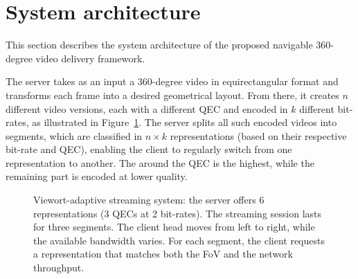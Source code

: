 \section{System architecture}

%    

This section describes the system architecture of the proposed
navigable 360-degree video delivery framework.

The server takes as an input a 360-degree video in
equirectangular format and transforms each frame into a desired
geometrical layout. From there, it creates $n$ different video
versions, each with a different \ac{QEC} and encoded in $k$ different
bit-rates, as illustrated in Figure~\ref{fig:newdelivery}. The server
splits all such encoded videos into segments, which are classified in
$n\!\times\!k$ representations (based on their respective bit-rate and
\ac{QEC}), enabling the client to regularly switch from one
representation to another. The  around the
\ac{QEC} is the highest, while the remaining part is encoded at lower
quality.

\begin{figure}
   \centering
   
   \caption{Viewort-adaptive streaming system: the server offers \num{6} representations (\num{3} \acp{QEC} at \num{2} bit-rates). The streaming session lasts for three segments. The client head moves from left to right, while the available bandwidth varies. For each segment, the client requests a representation that matches both the \ac{FoV} and the network throughput.}
   \label{fig:newdelivery}
\end{figure}


